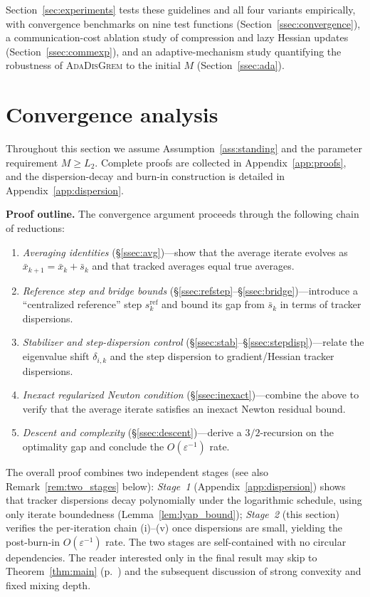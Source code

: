 \documentclass[11pt,a4paper]{article}
\def\cO{O}%
\newcommand{\cO}{\mathcal{O}}
\begin{document}
	\noindent
	Section~\ref{sec:experiments} tests these guidelines and all four
	variants empirically, with convergence benchmarks on nine test functions
	(Section~\ref{ssec:convergence}), a communication-cost ablation study
	of compression and lazy Hessian updates (Section~\ref{ssec:commexp}),
	and an adaptive-mechanism study quantifying the robustness of
	\textsc{AdaDisGrem} to the initial $M$ (Section~\ref{ssec:ada}).
	
	
\section{Convergence analysis}\label{sec:theory}
Throughout this section we assume Assumption~\ref{ass:standing}
and the parameter requirement $M\ge L_2$.
Complete proofs are collected in Appendix~\ref{app:proofs}, and the
dispersion-decay and burn-in construction is detailed in
Appendix~\ref{app:dispersion}.

\noindent\textbf{Proof outline.}
The convergence argument proceeds through the following chain of
reductions:
\begin{enumerate}[leftmargin=1.8em,itemsep=1pt,label=\textbf{(\roman*)}]
	\item \emph{Averaging identities}
	  (\S\ref{ssec:avg})---show that the average iterate evolves as
	  $\bar x_{k+1}=\bar x_k+\bar s_k$ and that tracked averages
	  equal true averages.
	\item \emph{Reference step and bridge bounds}
	  (\S\ref{ssec:refstep}--\S\ref{ssec:bridge})---introduce a
	  ``centralized reference'' step $s_k^{\mathrm{ref}}$ and bound
	  its gap from $\bar s_k$ in terms of tracker dispersions.
	\item \emph{Stabilizer and step-dispersion control}
	  (\S\ref{ssec:stab}--\S\ref{ssec:stepdisp})---relate the
	  eigenvalue shift $\delta_{i,k}$ and the step dispersion to
	  gradient/Hessian tracker dispersions.
	\item \emph{Inexact regularized Newton condition}
	  (\S\ref{ssec:inexact})---combine the above to verify that the
	  average iterate satisfies an inexact Newton residual bound.
	\item \emph{Descent and complexity}
	  (\S\ref{ssec:descent})---derive a $3/2$-recursion on the
	  optimality gap and conclude the $\cO(\varepsilon^{-1})$ rate.
\end{enumerate}
The overall proof combines two independent stages (see also
Remark~\ref{rem:two_stages} below):
\emph{Stage~1} (Appendix~\ref{app:dispersion}) shows that tracker
dispersions decay polynomially under the logarithmic schedule,
using only iterate boundedness (Lemma~\ref{lem:lyap_bound});
\emph{Stage~2} (this section) verifies the per-iteration chain
(i)--(v) once dispersions are small, yielding the post-burn-in
$\cO(\varepsilon^{-1})$ rate.
The two stages are self-contained with no circular dependencies.
The reader interested only in the final result may skip to
Theorem~\ref{thm:main} (p.~\pageref{thm:main}) and the subsequent
discussion of strong convexity and fixed mixing depth.
\end{document}
